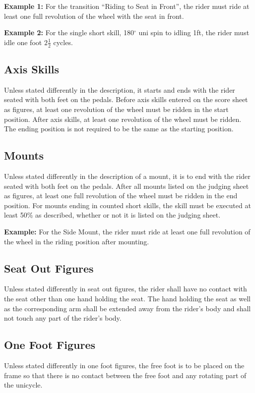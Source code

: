 \textbf{Example 1:} For the transition ``Riding to Seat in Front'', the rider must ride at least one full revolution of the wheel with the seat in front.

\textbf{Example 2:} For the single short skill, 180$^\circ$ uni spin to idling 1ft, the rider must idle one foot $2 \frac{1}{2}$ cycles.

\subsection{Axis Skills}
Unless stated differently in the description, it starts and ends with the rider seated with both feet on the pedals.
Before axis skills entered on the score sheet as figures, at least one revolution of the wheel must be ridden in the start position.
After axis skills, at least one revolution of the wheel must be ridden.
The ending position is not required to be the same as the starting position.

\subsection{Mounts}
Unless stated differently in the description of a mount, it is to end with the rider seated with both feet on the pedals.
After all mounts listed on the judging sheet as figures, at least one full revolution of the wheel must be ridden in the end position.
For mounts ending in counted short skills, the skill must be executed at least 50\% as described, whether or not it is listed on the judging sheet.

\textbf{Example:} For the Side Mount, the rider must ride at least one full revolution of the wheel in the riding position after mounting.

\subsection{Seat Out Figures}
Unless stated differently in seat out figures, the rider shall have no contact with the seat other than one hand holding the seat.
The hand holding the seat as well as the corresponding arm shall be extended away from the rider's body and shall not touch any part of the rider's body.

\subsection{One Foot Figures}
Unless stated differently in one foot figures, the free foot is to be placed on the frame so that there is no contact between the free foot and any rotating part of the unicycle.

